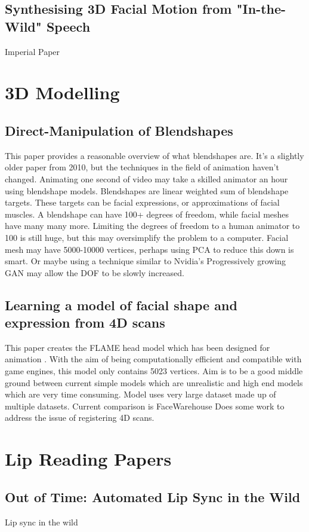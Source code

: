 \documentclass[12pt]{article}
\begin{document}
\subsection{Synthesising 3D Facial Motion from "In-the-Wild" Speech}
Imperial Paper \cite{Tzirakis2019}

\section{3D Modelling}
\subsection{Direct-Manipulation of Blendshapes}
This paper \cite{Lewis2010} provides a reasonable overview of what blendshapes are.
It's a slightly older paper from 2010, but the techniques in the field of animation haven't changed.
Animating one second of video may take a skilled animator an hour using blendshape models.
Blendshapes are linear weighted sum of blendshape targets.
These targets can be facial expressions, or approximations of facial muscles.
A blendshape can have 100+ degrees of freedom, while facial meshes have many many more.
Limiting the degrees of freedom to a human animator to 100 is still huge, but this may oversimplify the problem to a computer.
Facial mesh may have 5000-10000 vertices, perhaps using PCA to reduce this down is smart.
Or maybe using a technique similar to Nvidia's Progressively growing GAN \cite{Karras2017b} may allow the DOF to be slowly increased.

\subsection{Learning a model of facial shape and expression from 4D scans}
This paper creates the FLAME head model which has been designed for animation \cite{Li2017}.
With the aim of being computationally efficient and compatible with game engines, this model only contains 5023 vertices.
Aim is to be a good middle ground between current simple models which are unrealistic and high end models which are very time consuming.
Model uses very large dataset made up of multiple datasets.
Current comparison is FaceWarehouse
Does some work to address the issue of registering 4D scans.


\section{Lip Reading Papers}
\subsection{Out of Time: Automated Lip Sync in the Wild}
Lip sync in the wild \cite{Chung2016}
\end{document}

